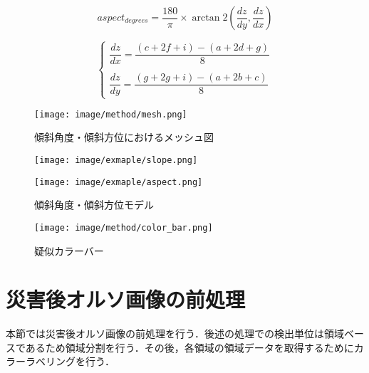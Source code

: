       \begin{equation}
        \label{傾斜方位}
        aspect_{degrees} = 
        \dfrac{180} {\pi} \times
        \arctan 2 (\dfrac{dz}{dy}, \dfrac{dz}{dx})
      \end{equation}

      \begin{equation}
        \label{X方向・Y方向の変化率}
        \left\{
          \begin{array}{l}
            \dfrac{dz}{dx} = 
              \dfrac {(c + 2f + i) - (a + 2d + g)} {8} \\ \\
            \dfrac{dz}{dy} = 
              \dfrac {(g + 2g + i) - (a + 2b + c)} {8}    
          \end{array}
        \right.
      \end{equation}

      \begin{figure}[tbp]
        \centering
        \texttt{[image: image/method/mesh.png]}
        \caption{傾斜角度・傾斜方位におけるメッシュ図}
        \label{メッシュ図}
      \end{figure}
      
      \begin{figure}[tbp]
        \begin{minipage}[c]{0.5\hsize}
          \centering
          \texttt{[image: image/exmaple/slope.png]}
        \end{minipage}
        \begin{minipage}[c]{0.5\hsize}
          \centering
          \texttt{[image: image/exmaple/aspect.png]}
        \end{minipage}
        \caption{傾斜角度・傾斜方位モデル}
        \label{傾斜角度・傾斜方位モデル}
      \end{figure}

      \begin{figure}[tbp]
        \centering
        \texttt{[image: image/method/color\_bar.png]}
        \caption{疑似カラーバー}
        \label{疑似カラーバー}
      \end{figure}


  \section{災害後オルソ画像の前処理}
    本節では災害後オルソ画像の前処理を行う．後述の処理での検出単位は領域ベースであるため領域分割を行う．その後，各領域の領域データを取得するためにカラーラベリングを行う．


